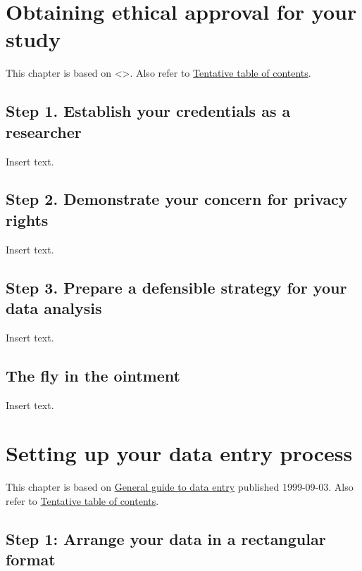 \documentclass[
  letterpaper,
  DIV=11,
  numbers=noendperiod]{scrreprt}
\begin{document}
\chapter{Obtaining ethical approval for your
study}\label{obtaining-ethical-approval-for-your-study}

This chapter is based on \textless{}\textgreater. Also refer to
\href{http://www.pmean.com/10/Contents.html}{Tentative table of
contents}.

\section{Step 1. Establish your credentials as a
researcher}\label{step-1.-establish-your-credentials-as-a-researcher}

Insert text.

\section{Step 2. Demonstrate your concern for privacy
rights}\label{step-2.-demonstrate-your-concern-for-privacy-rights}

Insert text.

\section{Step 3. Prepare a defensible strategy for your data
analysis}\label{step-3.-prepare-a-defensible-strategy-for-your-data-analysis}

Insert text.

\section{The fly in the ointment}\label{the-fly-in-the-ointment-4}

Insert text.


\chapter{Setting up your data entry
process}\label{setting-up-your-data-entry-process}

This chapter is based on
\href{http://www.pmean.com/99/entry.html}{General guide to data entry}
published 1999-09-03. Also refer to
\href{http://www.pmean.com/10/Contents.html}{Tentative table of
contents}.

\section{Step 1: Arrange your data in a rectangular
format}\label{step-1-arrange-your-data-in-a-rectangular-format}
\end{document}
